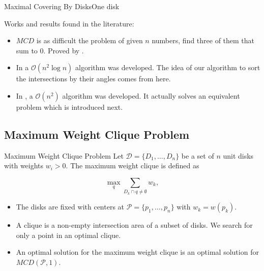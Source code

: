 \documentclass{beamer}
\newcommand{\D}{\mathscr{D}}
\newcommand{\Pp}{\mathscr{P}}
\newcommand{\bigO}{\mathscr{O}}
\begin{document}
\begin{frame}{Maximal Covering By Disks}{One disk}
	
	Works and results found in the literature:
	
	\begin{itemize}
		\item $MCD$ is as difficult the problem of given $n$ numbers, find three of them that sum to $0$. Proved by \autocite{aronov:2008}.
		
		\item In \autocite{drezner} a $\bigO(n^2\log{n})$ algorithm was developed. The idea of our algorithm to sort the intersections by their angles comes from here.
		
		\item In \autocite{chazelle:1986}, a $\bigO(n^2)$ algorithm was developed. It actually solves an equivalent problem which is introduced next.
	\end{itemize}
	
	
	
\end{frame}

\subsection{Maximum Weight Clique Problem}
\begin{frame}{Maximum Weight Clique Problem}
	Let $\D=\{D_1,\dots,D_n\}$ be a set of $n$ unit disks with weights $w_i>0$. The maximum weight clique is defined as
	
	\begin{equation*}
	\max_q \sum_{D_k \cap q \neq \emptyset} w_k,
	\end{equation*}
	
	\begin{itemize}
		\item The disks are fixed with centers at $\Pp =\{p_1,\dots,p_n\}$ with $w_k=w(p_k)$.
		\item A clique is a non-empty intersection area of a subset of disks. We search for only a point in an optimal clique.
		\item An optimal solution for the maximum weight clique is an optimal solution for $MCD(\Pp,1)$.
	\end{itemize}
\end{frame}
\end{document}
